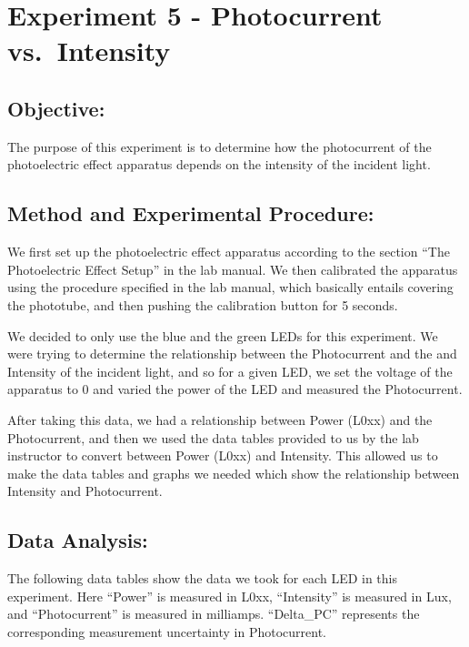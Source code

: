 \documentclass[11pt]{article}
\begin{document}
    \hypertarget{experiment-5---photocurrent-vs.-intensity}{%
\section{Experiment 5 - Photocurrent
vs.~Intensity}\label{experiment-5---photocurrent-vs.-intensity}}

\hypertarget{objective}{%
\subsection{Objective:}\label{objective}}

The purpose of this experiment is to determine how the photocurrent of
the photoelectric effect apparatus depends on the intensity of the
incident light.

\hypertarget{method-and-experimental-procedure}{%
\subsection{Method and Experimental
Procedure:}\label{method-and-experimental-procedure}}

We first set up the photoelectric effect apparatus according to the
section ``The Photoelectric Effect Setup'' in the lab manual. We then
calibrated the apparatus using the procedure specified in the lab
manual, which basically entails covering the phototube, and then pushing
the calibration button for 5 seconds.

We decided to only use the blue and the green LEDs for this experiment.
We were trying to determine the relationship between the Photocurrent
and the and Intensity of the incident light, and so for a given LED, we
set the voltage of the apparatus to 0 and varied the power of the LED
and measured the Photocurrent.

After taking this data, we had a relationship between Power (L0xx) and
the Photocurrent, and then we used the data tables provided to us by the
lab instructor to convert between Power (L0xx) and Intensity. This
allowed us to make the data tables and graphs we needed which show the
relationship between Intensity and Photocurrent.

    \hypertarget{data-analysis}{%
\subsection{Data Analysis:}\label{data-analysis}}

The following data tables show the data we took for each LED in this
experiment. Here ``Power'' is measured in L0xx, ``Intensity'' is
measured in Lux, and ``Photocurrent'' is measured in milliamps.
``Delta\_PC'' represents the corresponding measurement uncertainty in
Photocurrent.
\end{document}
